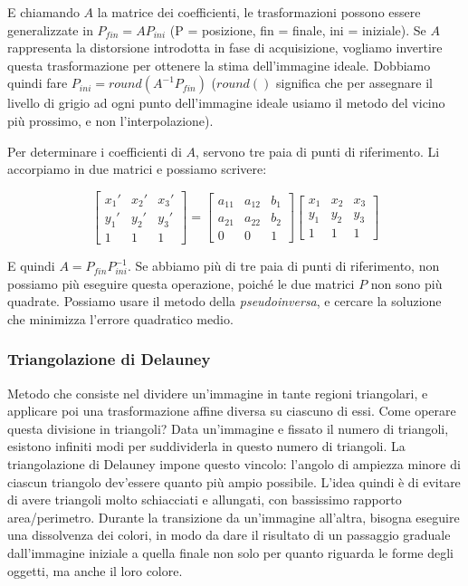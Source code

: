 \documentclass[a4paper,11pt]{article}
\begin{document}
E chiamando $A$ la matrice dei coefficienti, le trasformazioni possono essere generalizzate in $P_{fin} = A P_{ini}$
(P = posizione, fin = finale, ini = iniziale).
Se $A$ rappresenta la distorsione introdotta in fase di acquisizione, vogliamo invertire questa trasformazione per ottenere la stima dell'immagine ideale.
Dobbiamo quindi fare $P_{ini} = round(A^{-1} P_{fin})$ ($round()$ significa che per assegnare il livello di grigio ad ogni punto dell'immagine ideale usiamo
il metodo del vicino più prossimo, e non l'interpolazione).
\par
Per determinare i coefficienti di $A$, servono tre paia di punti di riferimento. Li accorpiamo in due matrici e possiamo scrivere:

\begin{equation*}
\begin{bmatrix} x_{1}' & x_{2}' & x_{3}' \\ y_{1}' & y_{2}' & y_{3}' \\ 1 & 1 & 1 \end{bmatrix} = \begin{bmatrix} a_{11} & a_{12} & b_1 \\ a_{21} & a_{22} & b_2 \\ 0 & 0 & 1 \end{bmatrix}
\begin{bmatrix} x_{1} & x_{2} & x_{3} \\ y_{1} & y_{2} & y_{3} \\ 1 & 1 & 1 \end{bmatrix}
\end{equation*}

E quindi $A = P_{fin} P_{ini}^{-1}$. Se abbiamo più di tre paia di punti di riferimento, non possiamo più eseguire questa operazione,
poiché le due matrici $P$ non sono più quadrate. Possiamo usare il metodo della \textit{pseudoinversa},
e cercare la soluzione che minimizza l'errore quadratico medio.

\subsubsection{Triangolazione di Delauney}
Metodo che consiste nel dividere un'immagine in tante regioni triangolari, e applicare poi una trasformazione affine diversa su ciascuno di essi.
Come operare questa divisione in triangoli? Data un'immagine e fissato il numero di triangoli, esistono infiniti modi per suddividerla in
questo numero di triangoli. La triangolazione di Delauney impone questo vincolo: l'angolo di ampiezza minore di ciascun triangolo dev'essere
quanto più ampio possibile. L'idea quindi è di evitare di avere triangoli molto schiacciati e allungati, con bassissimo rapporto area/perimetro.
Durante la transizione da un'immagine all'altra, bisogna eseguire una dissolvenza dei colori, in modo da dare il risultato
di un passaggio graduale dall'immagine iniziale a quella finale non solo per quanto riguarda le forme degli oggetti, ma anche il loro colore.
\end{document}

